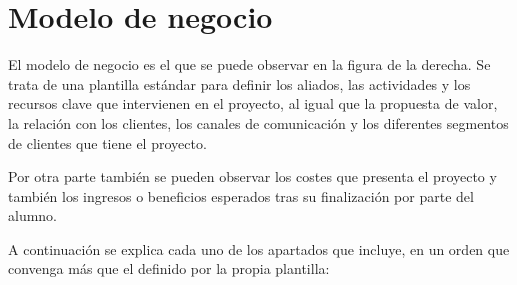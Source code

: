 \section{Modelo de negocio}
El modelo de negocio es el que se puede observar en la figura de la derecha. Se trata de una plantilla estándar para definir los aliados, las actividades y los recursos clave que intervienen en el proyecto, al igual que la propuesta de valor, la relación con los clientes, los canales de comunicación y los diferentes segmentos de clientes que tiene el proyecto. \par
Por otra parte también se pueden observar los costes que presenta el proyecto y también los ingresos o beneficios esperados tras su finalización por parte del alumno. \par
A continuación se explica cada uno de los apartados que incluye, en un orden que convenga más que el definido por la propia plantilla: 
